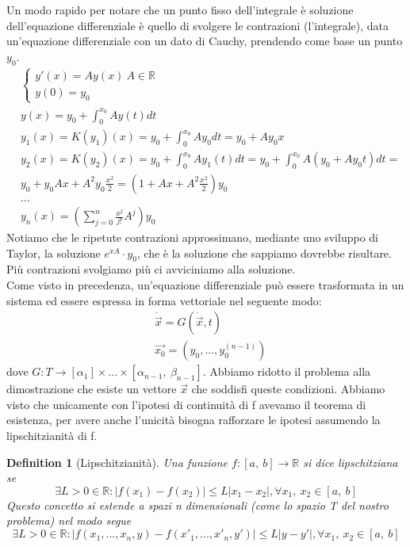 \documentclass[10pt,a4paper]{article}
\newtheorem{definition}{Definition}
\begin{document}
Un modo rapido per notare che un punto fisso dell'integrale è soluzione dell'equazione differenziale è quello di svolgere le contrazioni (l'integrale), data un'equazione differenziale con un dato di Cauchy, prendendo come base un punto \(y_0\). 
\begin{align*}
	&\begin{cases}
		y'(x)=Ay(x)\ A\in \mathbb{R}\\
		y(0)=y_0
	\end{cases}\\
	&y(x)=y_0+\int_{0}^{x_0}Ay(t)dt\\
	&y_1(x)=K(y_1)(x)=y_0+\int_{0}^{x_0}Ay_0dt=y_0+Ay_0x\\
	&y_2(x)=K(y_2)(x)=y_0+\int_{0}^{x_0}Ay_1(t)dt=y_0+\int_{0}^{x_0}A(y_0+Ay_0t)dt=\\
	&y_0+y_0Ax+A^2y_0\frac{x^2}{2}=(1+Ax+A^2\frac{x^2}{2})y_0\\
	&...\\
	&y_n(x)=\left(\sum_{j=0}^{n}\frac{x^j}{j!}A^j\right)y_0
\end{align*}
Notiamo che le ripetute contrazioni approssimano, mediante uno sviluppo di Taylor, la soluzione \(e^{xA}\cdot y_0\), che è la soluzione che sappiamo dovrebbe risultare. Più contrazioni svolgiamo più ci avviciniamo alla soluzione.\\
Come visto in precedenza, un'equazione differenziale può essere trasformata in un sistema ed essere espressa in forma vettoriale nel seguente modo:
\begin{align}
	&\dot\vec{x} = G(\dot{\vec{x}},t)\\
	&\vec{x_0}=(y_0,...,y^{(n-1)}_0)
\end{align}
dove \(G: T \rightarrow [\alpha_1]\times...\times[\alpha_{n-1},\ \beta_{n-1}]\). Abbiamo ridotto il problema alla dimostrazione che esiste un vettore $\vec{x}$ che soddisfi queste condizioni. 
Abbiamo visto che unicamente con l'ipotesi di continuità di f avevamo il teorema di esistenza, per avere anche l'unicità bisogna rafforzare le ipotesi assumendo la lipschitzianità di f.  
\begin{definition}[Lipschitzianità]
	Una funzione \(f:[a,\ b]\rightarrow \mathbb{R}\) si dice lipschitziana se
	\[\exists L>0 \in\mathbb{R}: |f(x_1)-f(x_2)|\leq L |x_1 - x_2|, \forall x_1,\ x_2\in[a,\ b]\]
	Questo concetto si estende a spazi n dimensionali (come lo spazio T del nostro problema) nel modo segue
		\[\exists L>0 \in\mathbb{R}: |f(x_1,...,x_n,y)-f(x'_1,...,x'_n,y')|\leq L |y - y'|, \forall x_1,\ x_2\in[a,\ b]\]
\end{definition}
\end{document}
